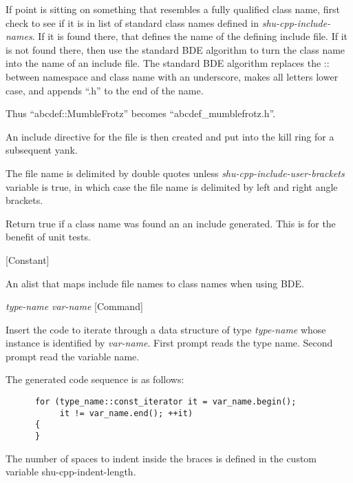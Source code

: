 \begin{doc-string}
If point is sitting on something that resembles a fully qualified class name,
first check to see if it is in list of standard class names defined in
\emph{shu-cpp-include-names}.  If it is found there, that defines the name of the
defining include file.  If it is not found there, then use the standard BDE
algorithm to turn the class name into the name of an include file.  The standard
BDE algorithm replaces the :: between namespace and class name with an
underscore, makes all letters lower case, and appends ``.h'' to the end of the
name.

Thus ``abcdef::MumbleFrotz'' becomes ``abcdef\_mumblefrotz.h''.

An include directive for the file is then created and put into the kill ring for
a subsequent yank.

The file name is delimited by double quotes unless \emph{shu-cpp-include-user-brackets}
variable is true, in which case the file name is delimited by left and right
angle brackets.

Return true if a class name was found an an include generated.  This is for the
benefit of unit tests.
\end{doc-string}

\vspace{1em}
\noindent
{}
\usebox{\funcname}
 \hfill [Constant]

\begin{doc-string}
An alist that maps include file names to class names when using BDE.
\end{doc-string}

\vspace{1em}
\noindent
{}
\usebox{\funcname}\emph{type-name} \emph{var-name}
 \hfill [Command]

\begin{doc-string}
Insert the code to iterate through a data structure of type \emph{type-name} whose
instance is identified by \emph{var-name}.  First prompt reads the type name.  Second
prompt read the variable name.

The generated code sequence is as follows:

\small{\begin{verbatim}
      for (type_name::const_iterator it = var_name.begin();
           it != var_name.end(); ++it)
      {
      }
\end{verbatim}}

The number of spaces to indent inside the braces is defined in the custom
variable shu-cpp-indent-length.
\end{doc-string}

